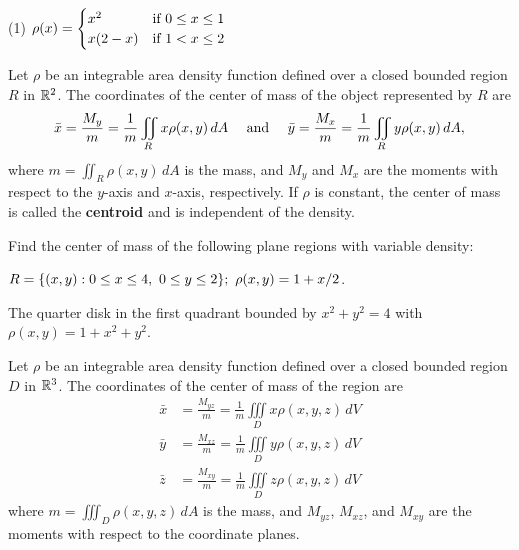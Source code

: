 \documentclass[mathNotesPreamble]{subfiles}
\begin{document}
  \begin{tasks}[after-item-skip=\stretch{1}, label=, resume](1)
    \task 
      $\rho(x)=\begin{cases}
        x^2& \textnormal{if } 0\leq x\leq 1\\
        x(2-x)& \textnormal{if } 1<x\leq 2
      \end{cases}$
  \end{tasks}
  \pagebreak

  \begin{defn*}
    Let $\rho$ be an integrable area density function defined over a closed bounded region $R$ in $\mathbb{R}^2$. The coordinates of the center of mass of the object represented by $R$ are
      \[\bar{x}=\frac{M_y}{m}=\frac{1}{m}\iint\limits_R x\rho(x,y)\,dA\quad \textnormal{ and }\quad \bar{y}=\frac{M_x}{m}=\frac{1}{m}\iint\limits_R y\rho(x,y)\,dA,\]
    where $m=\iint_R \rho(x,y)\,dA$ is the mass, and $M_y$ and $M_x$ are the moments with respect to the $y$-axis and $x$-axis, respectively. If $\rho$ is constant, the center of mass is called the \textbf{centroid} and is independent of the density.
  \end{defn*}
  \begin{ex*}
    Find the center of mass of the following plane regions with variable density:
  \end{ex*}
  $R={\left\{(x,y): 0\leq x\leq 4,\ 0\leq y\leq 2\right\}};\ \rho(x,y)=1+x/2$.
  \pagebreak

  The quarter disk in the first quadrant bounded by $x^2+y^2=4$ with $\rho(x,y)=1+x^2+y^2$.
  \pagebreak

  \begin{defn*}
    Let $\rho$ be an integrable area density function defined over a closed bounded region $D$ in $\mathbb{R}^3$. The coordinates of the center of mass of the region are
    \begin{align*}
      \bar{x}&=\frac{M_{yz}}{m}=\frac{1}{m}\iiint\limits_D x\rho(x,y,z)\,dV\\
      \bar{y}&=\frac{M_{xz}}{m}=\frac{1}{m}\iiint\limits_D y\rho(x,y,z)\,dV\\
      \bar{z}&=\frac{M_{xy}}{m}=\frac{1}{m}\iiint\limits_D z\rho(x,y,z)\,dV
    \end{align*}
    where $m=\iiint_D \rho(x,y,z)\,dA$ is the mass, and $M_{yz}$, $M_{xz}$, and $M_{xy}$ are the moments with respect to the coordinate planes.
  \end{defn*}

  \pagebreak
  
\end{document}
